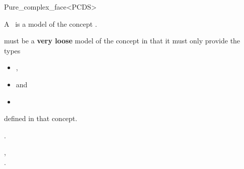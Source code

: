 \begin{ccRefClass}{Pure_complex_face<PCDS>}

\ccDefinition

A \ccRefName\ is a model of the concept .

\ccParameters

 must be a \textbf{very loose} model of the concept
 in that it must only provide the
types\begin{itemize}
\item {},
\item {} and
\item {}\end{itemize} defined in that concept.


\ccIsModel

.

\ccSeeAlso

,\\
.

\end{ccRefClass}

